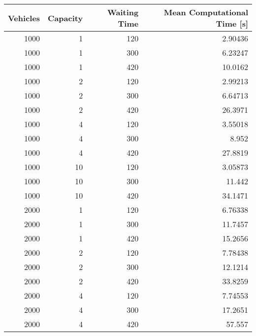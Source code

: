 \begin{tabular}{rrrr}
\hline
   Vehicles &   Capacity &   Waiting Time &   Mean Computational Time [s] \\
\hline
       1000 &          1 &            120 &                       2.90436 \\
       1000 &          1 &            300 &                       6.23247 \\
       1000 &          1 &            420 &                      10.0162  \\
       1000 &          2 &            120 &                       2.99213 \\
       1000 &          2 &            300 &                       6.64713 \\
       1000 &          2 &            420 &                      26.3971  \\
       1000 &          4 &            120 &                       3.55018 \\
       1000 &          4 &            300 &                       8.952   \\
       1000 &          4 &            420 &                      27.8819  \\
       1000 &         10 &            120 &                       3.05873 \\
       1000 &         10 &            300 &                      11.442   \\
       1000 &         10 &            420 &                      34.1471  \\
       2000 &          1 &            120 &                       6.76338 \\
       2000 &          1 &            300 &                      11.7457  \\
       2000 &          1 &            420 &                      15.2656  \\
       2000 &          2 &            120 &                       7.78438 \\
       2000 &          2 &            300 &                      12.1214  \\
       2000 &          2 &            420 &                      33.8259  \\
       2000 &          4 &            120 &                       7.74553 \\
       2000 &          4 &            300 &                      17.2651  \\
       2000 &          4 &            420 &                      57.557   \\

\end{tabular}
